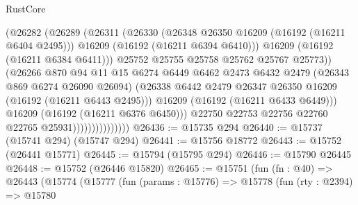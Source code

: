 \begin{lexlean}{RustCore}
\begin{coremodule}
                                    (@26282
                                      (@26289
                                        (@26311
                                          (@26330
                                            (@26348 @26350 @16209 (@16192 (@16211 @6404 @2495)))
                                            @16209
                                            (@16192 (@16211 @6394 @6410)))
                                          @16209
                                          (@16192 (@16211 @6384 @6411)))
                                        @25752
                                        @25755
                                        @25758
                                        @25762
                                        @25767
                                        @25773))
                                    (@26266
                                      @870
                                      @94
                                      @11
                                      @15
                                      @6274
                                      @6449
                                      @6462
                                      @2473
                                      @6432
                                      @2479
                                      (@26343 @869 @6274 @26090 @26094)
                                      (@26338
                                        @6442
                                        @2479
                                        @26347
                                        @26350
                                        @16209
                                        (@16192 (@16211 @6443 @2495)))
                                      @16209
                                      (@16192 (@16211 @6433 @6449)))
                                    @16209
                                    (@16192 (@16211 @6376 @6450)))
                                  @22750
                                  @22753
                                  @22756
                                  @22760
                                  @22765
                                  @25931)))))))))))))))
@26436 := @15735 @294
@26440 := @15737 (@15741 @294) (@15747 @294)
@26441 := @15756 @18772
@26443 := @15752 (@26441 @15771)
@26445 := @15794 (@15795 @294)
@26446 := @15790 @26445
@26448 := @15752 (@26446 @15820)
@26465 := @15751
    (fun (fn : @40) =>
    @26443
      (@15774
        (@15777
          (fun (params : @15776) =>
          @15778
            (fun (rty : @2394) =>
            @15780

\end{coremodule}
\end{lexlean}
